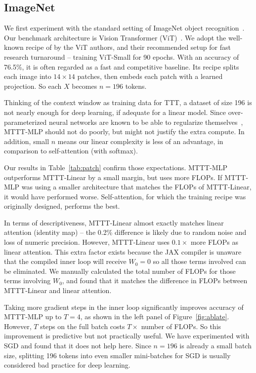 \documentclass{article}
\begin{document}
\subsection{ImageNet}
\label{subsec:patch}

We first experiment with the standard setting of ImageNet object recognition~\citep{deng2009imagenet}.
Our benchmark architecture is Vision Transformer (ViT)~\citep{dosovitskiy2020image}.
We adopt the well-known recipe of \cite{beyer2022better} by the ViT authors, and their recommended setup for fast research turnaround -- training ViT-Small for 90 epochs.
With an accuracy of 76.5\%, it is often regarded as a fast and competitive baseline.
Its recipe splits each image into $14\times 14$ patches, then embeds each patch with a learned projection. 
So each $X$ becomes $n=196$ tokens.

Thinking of the context window as training data for TTT, a dataset of size 196 is not nearly enough for deep learning, if adequate for a linear model. 
Since over-parameterized neural networks are known to be able to regularize themselves~\citep{zhang2021understanding}, 
MTTT-MLP should not do poorly, but might not justify the extra compute.
In addition, small $n$ means our linear complexity is less of an advantage, in comparison to self-attention (with softmax).

Our results in Table~\ref{tab:patch} confirm those expectations. 
MTTT-MLP outperforms MTTT-Linear by a small margin, but uses more FLOPs.
If MTTT-MLP was using a smaller architecture that matches the FLOPs of MTTT-Linear, it would have performed worse.
Self-attention, for which the training recipe was originally designed, performs the best.

In terms of descriptiveness, MTTT-Linear almost exactly matches linear attention (identity map) -- the 0.2\% difference is likely due to random noise and loss of numeric precision.
However, MTTT-Linear uses $0.1\times$ more FLOPs as linear attention.
This extra factor exists because the JAX compiler is unaware that the compiled inner loop will receive $W_0 = 0$ so all those terms involved can be eliminated. We manually calculated the total number of FLOPs for those terms involving $W_0$, and found that it matches the difference in FLOPs between MTTT-Linear and linear attention.

Taking more gradient steps in the inner loop significantly improves accuracy of MTTT-MLP up to $T=4$, as shown in the left panel of Figure~\ref{fig:ablate}.
However, $T$ steps on the full batch costs $T\times$ number of FLOPs.
So this improvement is predictive but not practically useful.
We have experimented with SGD and found that it does not help here.
Since $n=196$ is already a small batch size, splitting 196 tokens into even smaller mini-batches for SGD is usually considered bad practice for deep learning.
\end{document}
